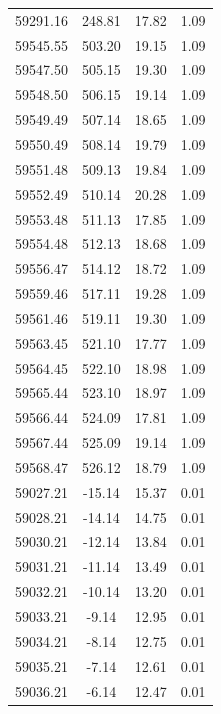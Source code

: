 \begin{longtable}{|c|c|c|c|}
 59291.16 &  248.81 &       17.82 &          1.09 \\
 59545.55 &  503.20 &       19.15 &          1.09 \\
 59547.50 &  505.15 &       19.30 &          1.09 \\
 59548.50 &  506.15 &       19.14 &          1.09 \\
 59549.49 &  507.14 &       18.65 &          1.09 \\
 59550.49 &  508.14 &       19.79 &          1.09 \\
 59551.48 &  509.13 &       19.84 &          1.09 \\
 59552.49 &  510.14 &       20.28 &          1.09 \\
 59553.48 &  511.13 &       17.85 &          1.09 \\
 59554.48 &  512.13 &       18.68 &          1.09 \\
 59556.47 &  514.12 &       18.72 &          1.09 \\
 59559.46 &  517.11 &       19.28 &          1.09 \\
 59561.46 &  519.11 &       19.30 &          1.09 \\
 59563.45 &  521.10 &       17.77 &          1.09 \\
 59564.45 &  522.10 &       18.98 &          1.09 \\
 59565.44 &  523.10 &       18.97 &          1.09 \\
 59566.44 &  524.09 &       17.81 &          1.09 \\
 59567.44 &  525.09 &       19.14 &          1.09 \\
 59568.47 &  526.12 &       18.79 &          1.09 \\
 59027.21 &  -15.14 &       15.37 &          0.01 \\
 59028.21 &  -14.14 &       14.75 &          0.01 \\
 59030.21 &  -12.14 &       13.84 &          0.01 \\
 59031.21 &  -11.14 &       13.49 &          0.01 \\
 59032.21 &  -10.14 &       13.20 &          0.01 \\
 59033.21 &   -9.14 &       12.95 &          0.01 \\
 59034.21 &   -8.14 &       12.75 &          0.01 \\
 59035.21 &   -7.14 &       12.61 &          0.01 \\
 59036.21 &   -6.14 &       12.47 &          0.01 \\

\end{longtable}
